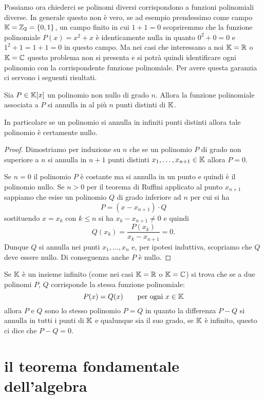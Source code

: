 Possiamo ora chiederci se polinomi diversi corrispondono
a funzioni polinomiali diverse.
In generale questo non è vero, se ad esempio prendessimo
come campo $\mathbb K=\mathbb Z_2 = \{0,1\}$, un campo finito
in cui $1+1=0$ scopriremmo che la funzione polinomiale
$P(x) = x^2+x$ è identicamente nulla in quanto $0^2+0=0$
e $1^2+1=1+1=0$ in questo campo.
Ma nei casi che interessano a noi $\mathbb K=\mathbb R$ o $\mathbb K=\mathbb C$
questo problema non si presenta e si potrà quindi identificare
ogni polinomio con la corrispondente funzione polinomiale.
Per avere questa garanzia ci servono i seguenti risultati.

\begin{theorem}
\label{th:annullamento_polinomi}%
%
Sia $P\in \mathbb K[x]$ un polinomio non nullo di grado $n$.
Allora la funzione polinomiale associata a $P$
si annulla in al più $n$ punti distinti di $\mathbb K$.

In particolare se un polinomio si annulla in infiniti
punti distinti allora tale polinomio è certamente nullo.
\end{theorem}
%
\begin{proof}
Dimostriamo per induzione su $n$ che se un polinomio
$P$ di grado non superiore a $n$ si annulla in $n+1$
punti distinti $x_1, \dots, x_{n+1}\in \mathbb K$ allora
$P=0$.

Se $n=0$ il polinomio $P$ è costante ma si annulla
in un punto e quindi è il polinomio nullo.
Se $n>0$ per il teorema di Ruffini applicato al
punto $x_{n+1}$ sappiamo che esise un polinomio $Q$
di grado inferiore ad $n$ per cui si ha
\[
  P = (x-x_{n+1}) \cdot Q
\]
sostituendo $x=x_k$ con $k\le n$ si ha $x_k-x_{n+1}\neq 0$
e quindi
\[
  Q(x_k) = \frac{P(x_k)}{x_k-x_{n+1}} = 0.
\]
Dunque $Q$ si annulla nei punti $x_1, \dots, x_n$
e, per ipotesi induttiva, scopriamo che $Q$ deve
essere nullo. Di conseguenza anche $P$ è nullo.
\end{proof}

Se $\mathbb K$ è un insieme infinito (come nei casi $\mathbb K=\mathbb R$ o $\mathbb K=\mathbb C$)
si trova che
se a due polinomi $P$, $Q$ corrisponde
la stessa funzione polinomiale:
\[
  P(x)=Q(x) \qquad \text{per ogni $x\in \mathbb K$}
\]
allora $P$ e $Q$ sono lo stesso polinomio $P=Q$
in quanto la differenza $P-Q$ si annulla in tutti i punti
di $\mathbb K$ e qualunque sia il suo grado, se $\mathbb K$ è infinito,
questo ci dice che $P-Q=0$.

\section{il teorema fondamentale dell'algebra}



